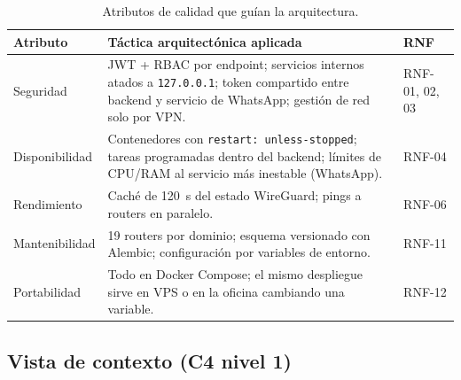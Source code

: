 \begin{table}[htbp]
\centering
\caption{Atributos de calidad que guían la arquitectura.}
\label{tab:ce02-atributos}
\small
\begin{tabularx}{\textwidth}{L{2.6cm}XL{2.6cm}}
\toprule
\textbf{Atributo} & \textbf{Táctica arquitectónica aplicada} & \textbf{RNF} \\
\midrule
Seguridad & JWT + RBAC por endpoint; servicios internos atados a \texttt{127.0.0.1}; token compartido entre backend y servicio de WhatsApp; gestión de red solo por VPN. & RNF-01, 02, 03 \\
Disponibilidad & Contenedores con \texttt{restart: unless-stopped}; tareas programadas dentro del backend; límites de CPU/RAM al servicio más inestable (WhatsApp). & RNF-04 \\
Rendimiento & Caché de 120~s del estado WireGuard; pings a routers en paralelo. & RNF-06 \\
Mantenibilidad & 19 routers por dominio; esquema versionado con Alembic; configuración por variables de entorno. & RNF-11 \\
Portabilidad & Todo en Docker Compose; el mismo despliegue sirve en VPS o en la oficina cambiando una variable. & RNF-12 \\
\bottomrule
\end{tabularx}
\end{table}

\subsection{Vista de contexto (C4 nivel 1)}

